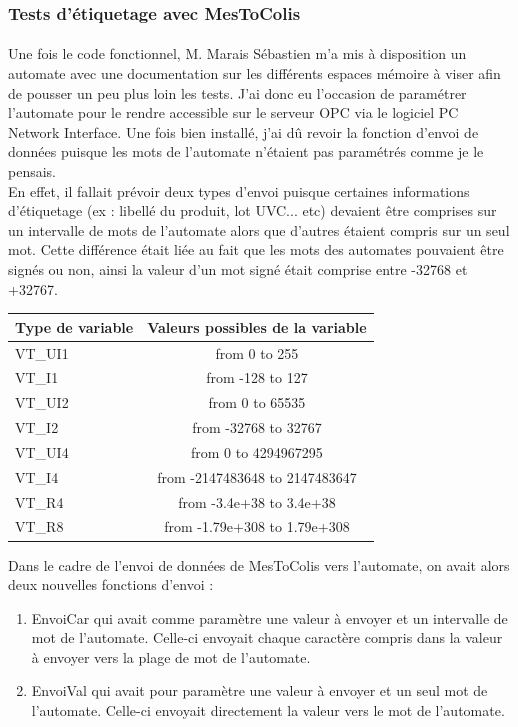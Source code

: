 \documentclass[a4paper,12pt]{extarticle}
\begin{document}
	\subsubsection{Tests d'étiquetage avec MesToColis}
		\paragraph{}
	
	Une fois le code fonctionnel, M. Marais Sébastien m’a mis à disposition un automate avec une documentation sur les différents espaces mémoire à viser afin de pousser un peu plus loin les tests. J’ai donc eu l’occasion de paramétrer l’automate pour le rendre accessible sur le serveur OPC via le logiciel PC Network Interface. Une fois bien installé, j’ai dû revoir la fonction d’envoi de données puisque les mots de l’automate n’étaient pas paramétrés comme je le pensais.\\
En effet, il fallait prévoir deux types d’envoi puisque certaines informations d’étiquetage (ex : libellé du produit, lot UVC... etc) devaient être comprises sur un intervalle de mots de l’automate alors que d’autres étaient compris sur un seul mot. Cette différence était liée au fait que les mots des automates pouvaient être signés ou non, ainsi la valeur d’un mot signé était comprise entre -32768 et +32767.

\begin{center}
	\begin{tabular}{|l|c|}
	\hline
		Type de variable & Valeurs possibles de la variable \\
	\hline
		VT\_UI1 & from 0 to 255 \\
		VT\_I1 & from -128 to 127 \\
		VT\_UI2 & from 0 to 65535 \\
		VT\_I2 & from -32768 to 32767 \\
		VT\_UI4 & from 0 to 4294967295 \\
		VT\_I4 & from -2147483648 to 2147483647 \\
		VT\_R4 & from -3.4e+38 to 3.4e+38 \\
		VT\_R8 & from -1.79e+308 to 1.79e+308 \\
	\hline
	\end{tabular}
\end{center}

Dans le cadre de l’envoi de données de MesToColis vers l’automate, on avait alors deux nouvelles fonctions d’envoi : \\

\begin{enumerate}[•]
	\item EnvoiCar qui avait comme paramètre une valeur à envoyer et un intervalle de mot de l’automate. Celle-ci envoyait chaque caractère compris dans la valeur à envoyer vers la plage de mot de l’automate.
	\item EnvoiVal qui avait pour paramètre une valeur à envoyer et un seul mot de l’automate. Celle-ci envoyait directement la valeur vers le mot de l’automate.
\end{enumerate}
\end{document}
